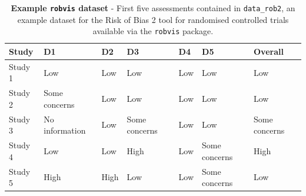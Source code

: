 \documentclass[a4paper, twoside]{templates/ociamthesis}
\begin{document}
\begin{table}[H]

\caption[Example \texttt{robvis} dataset]{\label{tab:biasData-table}\textbf{Example \texttt{robvis} dataset} - First five assessments contained in \texttt{data\_rob2}, an example dataset for the Risk of Bias 2 tool for randomised controlled trials available via the \texttt{robvis} package.}
\centering
\fontsize{8}{10}\selectfont
\begin{tabular}[t]{lllllll}
\toprule
\textbf{Study} & \textbf{D1} & \textbf{D2} & \textbf{D3} & \textbf{D4} & \textbf{D5} & \textbf{Overall}\\
\midrule
Study 1 & Low & Low & Low & Low & Low & Low\\
Study 2 & Some concerns & Low & Low & Low & Low & Low\\
Study 3 & No information & Low & Some concerns & Low & Low & Some concerns\\
Study 4 & Low & Low & High & Low & Some concerns & High\\
Study 5 & High & High & Low & Low & Some concerns & Low\\
\bottomrule
\end{tabular}
\end{table}

~
\end{document}
